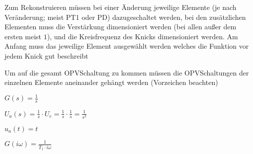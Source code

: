 \documentclass[letterpaper,10pt,english]{jupyterBook}
\begin{document}
\sphinxAtStartPar
Zum Rekonstruieren müssen bei einer Änderung jeweilige Elemente (je nach Veränderung; meist PT1 oder PD) dazugeschaltet werden,
bei den zusätzlichen Elementen muss die Verstärkung dimensioniert werden (bei allen außer dem ersten meist \(1\)),
und die Kreisfrequenz des Knicks dimensioniert werden.
Am Anfang muss das jeweilige Element ausgewählt werden welches die Funktion vor jedem Knick gut beschreibt

\sphinxAtStartPar
Um auf die gesamt OPV\sphinxhyphen{}Schaltung zu kommen müssen die OPV\sphinxhyphen{}Schaltungen der einzelnen Elemente aneinander gehängt werden (Vorzeichen beachten)

\begin{DUlineblock}{0em}
\item[] 
\end{DUlineblock}

\begin{DUlineblock}{0em}
\item[] 
\end{DUlineblock}

\begin{DUlineblock}{0em}
\item[] 
\end{DUlineblock}

\sphinxAtStartPar
\(G(s) = \frac{1}{s}\)

\begin{DUlineblock}{0em}
\item[] 
\end{DUlineblock}

\sphinxAtStartPar
\(U_a(s) = \frac{1}{s} \cdot U_e = \frac{1}{s}\cdot \frac{1}{s} = \frac{1}{s^2}\)

\sphinxAtStartPar
\(u_a(t) = t\)

\begin{DUlineblock}{0em}
\item[] 
\end{DUlineblock}

\sphinxAtStartPar
\(G(i\omega) = \frac{1}{T_1\cdot i\omega}\)

\begin{DUlineblock}{0em}
\item[] 
\end{DUlineblock}
\end{document}
